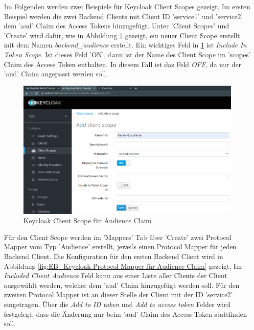 Im Folgenden werden zwei Beispiele für Keycloak Client Scopes gezeigt. Im ersten Beispiel werden die zwei Backend Clients mit Client ID 'service1' und 'service2' dem 'aud' Claim des Access Tokens hinzugefügt. Unter 'Client Scopes' und 'Create' wird dafür, wie in Abbildung \ref{fig:EB_Keycloak Client Scope für Audience Claim} gezeigt, ein neuer Client Scope erstellt mit dem Namen \textit{backend\_audience} erstellt. Ein wichtiges Feld in \ref{fig:EB_Keycloak Client Scope für Audience Claim} ist \textit{Include In Token Scope}. Ist dieses Feld 'ON', dann ist der Name des Client Scope im 'scopes' Claim des Access Token enthalten. In diesem Fall ist das Feld \textit{OFF}, da nur der 'aud' Claim angepasst werden soll.

\begin{figure}[!ht]
	\centering
	\includegraphics[width=1\textwidth]{Images/Ebert/KeycloakNewAudClientScope.PNG}
	\caption{Keycloak Client Scope für Audience Claim}
	\label{fig:EB_Keycloak Client Scope für Audience Claim}
\end{figure}

Für den Client Scope werden im 'Mappers' Tab über 'Create' zwei Protocol Mapper vom Typ 'Audience' erstellt, jeweils einen Protocol Mapper für jeden Backend Client. Die Konfiguration für den ersten Backend Client wird in Abbildung \ref{fig:EB_Keycloak Protocol Mapper für Audience Claim} gezeigt. Im \textit{Included Client Audience} Feld kann aus einer Liste aller Clients der Client ausgewählt werden, welcher dem 'aud' Claim hinzugefügt werden soll. Für den zweiten Protocol Mapper ist an dieser Stelle der Client mit der ID 'service2' eingetragen. Über die \textit{Add to ID token} und \textit{Add to access token} Felder wird festgelegt, dass die Änderung nur beim 'aud' Claim des Access Token stattfinden soll.

